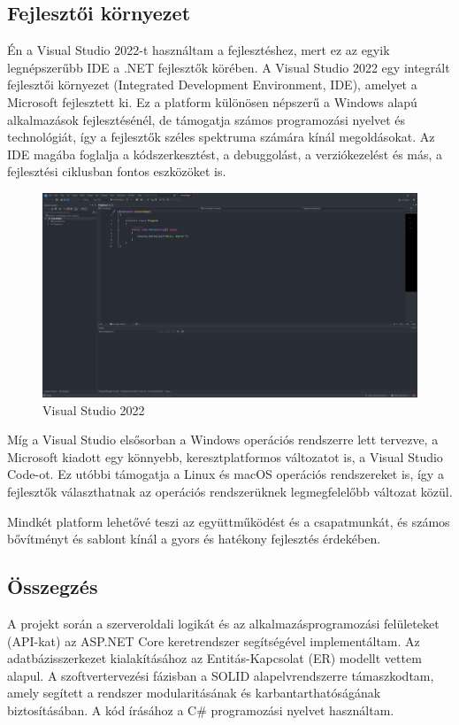 \subsection*{Fejlesztői környezet}
Én a Visual Studio 2022-t használtam a fejlesztéshez, mert ez az egyik legnépszerűbb IDE a .NET fejlesztők körében.
A Visual Studio 2022 egy integrált fejlesztői környezet (Integrated Development Environment, IDE), amelyet a Microsoft fejlesztett ki. Ez a platform különösen népszerű a Windows alapú alkalmazások fejlesztésénél, de támogatja számos programozási nyelvet és technológiát, így a fejlesztők széles spektruma számára kínál megoldásokat. Az IDE magába foglalja a kódszerkesztést, a debuggolást, a verziókezelést és más, a fejlesztési ciklusban fontos eszközöket is.
\begin{figure}[H]
    \centering
    \includegraphics[width=12.0truecm]{images/VisualStuido2022.png}
    \caption{Visual Studio 2022}\footnotemark
    \label{fig:VisualStuido2022}
\end{figure}
Míg a Visual Studio elsősorban a Windows operációs rendszerre lett tervezve, a Microsoft kiadott egy könnyebb, keresztplatformos változatot is, a Visual Studio Code-ot. Ez utóbbi támogatja a Linux és macOS operációs rendszereket is, így a fejlesztők választhatnak az operációs rendszerüknek legmegfelelőbb változat közül.

Mindkét platform lehetővé teszi az együttműködést és a csapatmunkát, és számos bővítményt és sablont kínál a gyors és hatékony fejlesztés érdekében.

\subsection*{Összegzés}
A projekt során a szerveroldali logikát és az alkalmazásprogramozási felületeket (API-kat) az ASP.NET Core keretrendszer segítségével implementáltam. Az adatbázisszerkezet kialakításához az Entitás-Kapcsolat (ER) modellt vettem alapul. A szoftvertervezési fázisban a SOLID alapelvrendszerre támaszkodtam, amely segített a rendszer modularitásának és karbantarthatóságának biztosításában. A kód írásához a C\# programozási nyelvet használtam.

